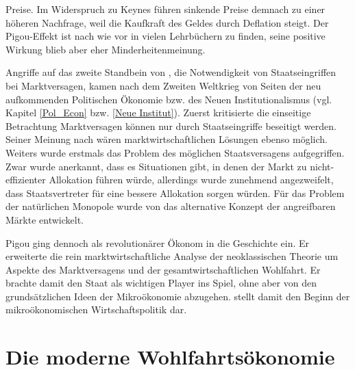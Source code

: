 Preise. Im Widerspruch zu Keynes führen sinkende Preise demnach zu einer höheren Nachfrage, weil die Kaufkraft des Geldes durch Deflation steigt. Der Pigou-Effekt ist nach wie vor in vielen Lehrbüchern zu finden, seine positive Wirkung blieb aber eher Minderheitenmeinung.

Angriffe auf das zweite Standbein von \textcite{Pigou1920}, die Notwendigkeit von Staatseingriffen bei Marktversagen, kamen nach dem Zweiten Weltkrieg von Seiten der neu aufkommenden Politischen Ökonomie bzw. des Neuen Institutionalismus (vgl. Kapitel \ref{Pol_Econ} bzw. \ref{Neue Institut}). Zuerst kritisierte \textcite{Coase1960} die einseitige Betrachtung Marktversagen können nur durch Staatseingriffe beseitigt werden. Seiner Meinung nach wären marktwirtschaftlichen Lösungen ebenso möglich. Weiters wurde erstmals das Problem des möglichen Staatsversagens aufgegriffen. Zwar wurde anerkannt, dass es Situationen gibt, in denen der Markt zu nicht-effizienter Allokation führen würde, allerdings wurde zunehmend angezweifelt, dass Staatsvertreter für eine bessere Allokation sorgen würden. Für das Problem der natürlichen Monopole wurde von \textcite{Baumol1982} das alternative Konzept der angreifbaren Märkte entwickelt.

Pigou ging dennoch als revolutionärer Ökonom in die Geschichte ein. Er erweiterte die rein marktwirtschaftliche Analyse der neoklassischen Theorie um Aspekte des Marktversagens und der gesamtwirtschaftlichen Wohlfahrt. Er brachte damit den Staat als wichtigen Player ins Spiel, ohne aber von den grundsätzlichen Ideen der Mikroökonomie abzugehen. \textcite{Pigou1920} stellt damit den Beginn der mikroökonomischen Wirtschaftspolitik dar.


\section{Die moderne Wohlfahrtsökonomie}
\label{Wohlfahrt}

